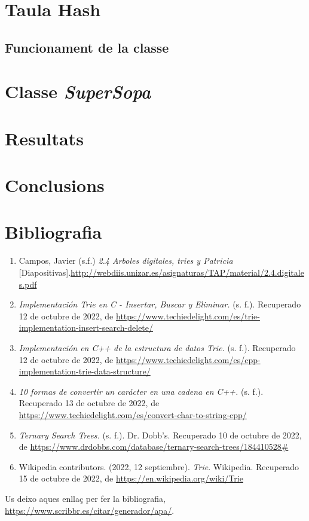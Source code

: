 \documentclass[titlepage]{article}
\begin{document}
\section{Taula Hash}
\subsection{Funcionament de la classe}

\section{Classe \textit{SuperSopa}}

\section{Resultats}

\section{Conclusions}

\section{Bibliografia}
\begin{enumerate}
    \item Campos, Javier (s.f.) \textit{2.4 Arboles digitales, tries y Patricia} [Diapositivas].\url{http://webdiis.unizar.es/asignaturas/TAP/material/2.4.digitales.pdf }
    \item \textit{Implementación Trie en C - Insertar, Buscar y Eliminar.} (s. f.). Recuperado 12 de octubre de 2022, de \url{https://www.techiedelight.com/es/trie-implementation-insert-search-delete/}
    \item \textit{Implementación en C++ de la estructura de datos Trie.} (s. f.). Recuperado 12 de octubre de 2022, de \url{https://www.techiedelight.com/es/cpp-implementation-trie-data-structure/}
    \item \textit{10 formas de convertir un carácter en una cadena en C++.} (s. f.). Recuperado 13 de octubre de 2022, de \url{https://www.techiedelight.com/es/convert-char-to-string-cpp/}
    \item \textit{Ternary Search Trees.} (s. f.). Dr. Dobb's. Recuperado 10 de octubre de 2022, de \url{https://www.drdobbs.com/database/ternary-search-trees/184410528#}
    \item Wikipedia contributors. (2022, 12 septiembre). \textit{Trie}. Wikipedia. Recuperado 15 de octubre de 2022, de \url{https://en.wikipedia.org/wiki/Trie}
\end{enumerate}

Us deixo aques enllaç per fer la bibliografia, \url{https://www.scribbr.es/citar/generador/apa/}.
\end{document}

